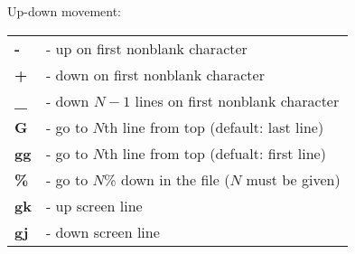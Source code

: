 \documentclass[a4paper,8pt]{extarticle}
\begin{document}
\begin{multicols*}{3}
        \noindent
        {\large Up-down movement:}\\
        \begin{tabular}{ l l }
            \textbf{-}                          &    - up on first nonblank character                       \\
            \textbf{+}                          &    - down on first nonblank character                     \\
            \textbf{\_}                         &    - down \(N-1\) lines on first nonblank character       \\
            \textbf{G}                          &    - go to \(N\)th line from top (default: last line)     \\
            \textbf{gg}                         &    - go to \(N\)th line from top (defualt: first line)    \\
            \textbf{\%}                         &    - go to \(N\)\% down in the file (\(N\) must be given) \\
            \textbf{gk}                         &    - up screen line                                       \\
            \textbf{gj}                         &    - down screen line                                     \\
        \end{tabular}



\end{multicols*}
\end{document}
